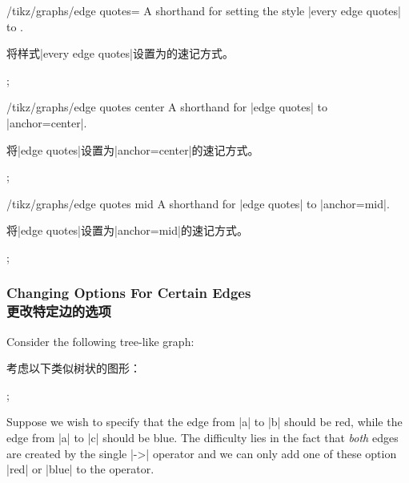 \begin{key}{/tikz/graphs/edge quotes=}
    A shorthand for setting the style |every edge quotes| to .
    
    将样式|every edge quotes|设置为的速记方式。
\begin{codeexample}[preamble={\usetikzlibrary{graphs,quotes}}]
  \tikz {};
\end{codeexample}
\end{key}

\begin{key}{/tikz/graphs/edge quotes center}
    A shorthand for |edge quotes| to |anchor=center|.
    
    将|edge quotes|设置为|anchor=center|的速记方式。
\begin{codeexample}[preamble={\usetikzlibrary{graphs,quotes}}]
\tikz {};
\end{codeexample}
\end{key}

\begin{key}{/tikz/graphs/edge quotes mid}
    A shorthand for |edge quotes| to |anchor=mid|.
    
    将|edge quotes|设置为|anchor=mid|的速记方式。
\begin{codeexample}[preamble={\usetikzlibrary{graphs,quotes}}]
\tikz {};
\end{codeexample}
\end{key}


\subsubsection{Changing Options For Certain Edges\\更改特定边的选项}

Consider the following tree-like graph:

考虑以下类似树状的图形：

\begin{codeexample}[preamble={\usetikzlibrary{graphs}}]
\tikz {};
\end{codeexample}

Suppose we wish to specify that the edge from |a| to |b| should be red, while
the edge from |a| to |c| should be blue. The difficulty lies in the fact that
\emph{both} edges are created by the single |->| operator and we can only add
one of these option |red| or |blue| to the operator.

